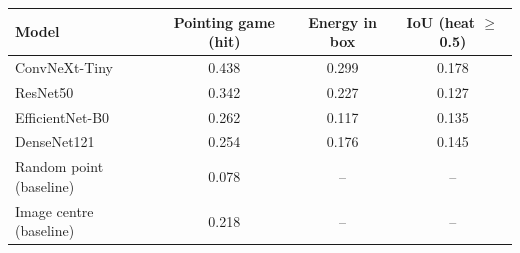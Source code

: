 \begin{tabular}{lccc}
\toprule
Model & Pointing game (hit) & Energy in box & IoU (heat $\geq$ 0.5) \\
\midrule
ConvNeXt-Tiny & 0.438 & 0.299 & 0.178 \\
ResNet50 & 0.342 & 0.227 & 0.127 \\
EfficientNet-B0 & 0.262 & 0.117 & 0.135 \\
DenseNet121 & 0.254 & 0.176 & 0.145 \\
\midrule
Random point (baseline) & 0.078 & -- & -- \\
Image centre (baseline) & 0.218 & -- & -- \\
\bottomrule
\end{tabular}
